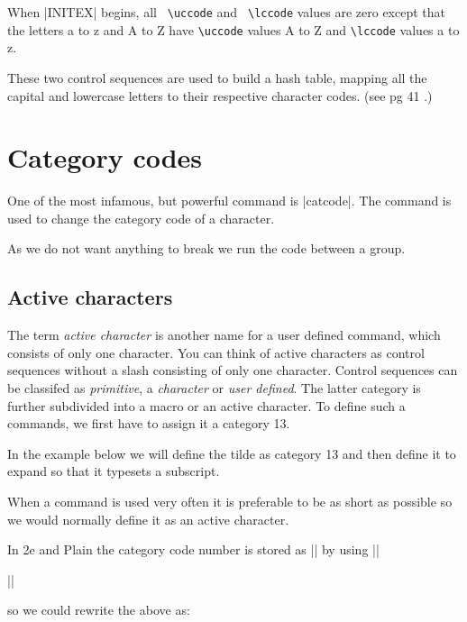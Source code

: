 When |INITEX| begins, all \verb+ \uccode+ and \verb+ \lccode+ values are zero except
that the letters a to z and A to Z have \verb+\uccode+ values A to Z and \verb+\lccode+ values a to z.

These two control sequences are used to build a hash table, mapping all the capital and lowercase letters to their respective character codes.
(see pg 41 \texbook.)

\section{Category codes}

One of the most infamous, but powerful \tex command is |catcode|. The command is used to change the category code of a character.

As we do not want anything to break we run the code between a group.

\subsection{Active characters}

The term \emph{active character} is another name for a user defined command, which consists of only one character. You can think of active characters as control sequences without a slash consisting of only one character. 
Control sequences can be classifed as \emph{primitive}, a \emph{character} or \emph{user defined}. The latter category is further subdivided into a macro or an active character. To define such a commands, we first have to assign it a category 13. 

In the example below we will define the tilde as category 13 and then define it to expand so that it typesets a subscript.


When a command is used very often it is preferable to be as short as possible so we would normally define it as an active character. 

In \latex2e and Plain the category code number is stored as |\active| by using |\chardef|

|\chardef{}|

so we could rewrite the above as:


